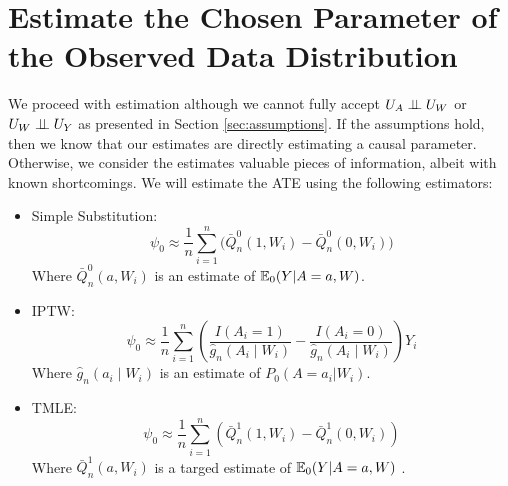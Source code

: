 \documentclass{article}
\begin{document}
\section{Estimate the Chosen Parameter of the Observed Data Distribution}
\label{sec:estimates}

We proceed with estimation although we cannot fully accept $U_A \perp\hspace{-5pt}\perp U_W$ or $U_W \perp\hspace{-5pt}\perp U_Y$ as presented in Section \ref{sec:assumptions}. If the assumptions hold, then we know that our estimates are directly estimating a causal parameter. Otherwise, we consider the estimates valuable pieces of information, albeit with known shortcomings. We will estimate the ATE using the following estimators: 

\begin{itemize}
  \item Simple Substitution:
    \[
      \psi_0 \approx \frac{1}{n}\sum_{i=1}^{n}\Big(\bar{Q}_{n}^{0}(1,W_i) - \bar{Q}_{n}^{0}(0,W_i)\Big)
    \]
Where $\bar{Q}_{n}^{0}(a,W_i)$ is an estimate of $\mathbb{E}_0(Y|A=a,W)$.
  \item IPTW:
  \[
    \psi_{0} \approx \frac{1}{n}\sum_{i=1}^{n} \left(\frac{I(A_i=1)}{\hat{g}_n(A_i \mid W_i)} - \frac{I(A_i=0)}{\hat{g}_n(A_i \mid W_i)} \right)Y_i
  \]
Where $\hat{g}_n(a_i \mid W_i)$ is an estimate of $P_0(A=a_i|W_i)$.
  \item TMLE:
  \[
    \psi_{0} \approx \frac{1}{n}\sum_{i=1}^{n}\left( \bar{Q}_{n}^{1}(1,W_i) - \bar{Q}_{n}^{1}(0,W_i)\right)
  \]
Where $\bar{Q}_{n}^{1}(a,W_i)$ is a targed estimate of $\mathbb{E}_0(Y|A=a,W)$ \cite{tmle}.
\end{itemize}
\end{document}

